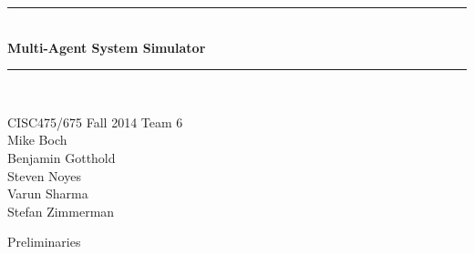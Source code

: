 
\thispagestyle{empty}%


\begin{center}

\vspace*{\fill}
\noindent\rule{13cm}{2pt}\\[0.5cm]
{\huge \bf Multi-Agent System Simulator}
\noindent\rule{13cm}{2pt}\\[1cm]
\vspace*{\fill}
\par CISC475/675 Fall 2014 Team 6 \\
         Mike Boch \\ 
         Benjamin Gotthold\\ 
         Steven Noyes \\ 
         Varun Sharma \\
         Stefan Zimmerman \\






\vfill

\date{\today}

\end{center}



\newpage
{Preliminaries}


